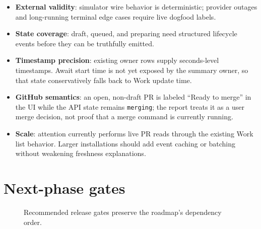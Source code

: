 \documentclass[10pt,a4paper]{article}
\newcommand{\code}[1]{\texttt{#1}}
\begin{document}
\begin{itemize}
  \item \textbf{External validity}: simulator wire behavior is deterministic;
        provider outages and long-running terminal edge cases require live
        dogfood labels.
  \item \textbf{State coverage}: draft, queued, and preparing need structured
        lifecycle events before they can be truthfully emitted.
  \item \textbf{Timestamp precision}: existing owner rows supply seconds-level
        timestamps.  Await start time is not yet exposed by the summary owner,
        so that state conservatively falls back to Work update time.
  \item \textbf{GitHub semantics}: an open, non-draft PR is labeled ``Ready to
        merge'' in the UI while the API state remains \code{merging}; the report
        treats it as a user merge decision, not proof that a merge command is
        currently running.
  \item \textbf{Scale}: attention currently performs live PR reads through the
        existing Work list behavior.  Larger installations should add event
        caching or batching without weakening freshness explanations.
\end{itemize}

\section{Next-phase gates}

\begin{figure}[ht]
\centering
{}
\caption{Recommended release gates preserve the roadmap's dependency order.}
\end{figure}
\end{document}
